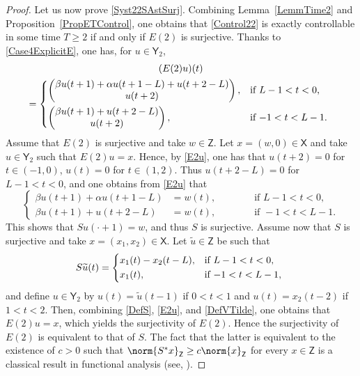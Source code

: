 \begin{proof}
Let us now prove \eqref{Syst22SAstSurj}. Combining Lemma~\ref{LemmTime2} and Proposition~\ref{PropETControl}, one obtains that \eqref{Control22} is exactly controllable in some time $T \geq 2$ if and only if $E(2)$ is surjective. Thanks to \eqref{Case4ExplicitE}, one has, for $u \in \mathsf Y_2$,\vspace*{-3pt}
\begin{multline}
\label{E2u}
(E(2) u)(t)\\ =
\begin{dcases*}
\begin{pmatrix}
\beta u(t + 1) + \alpha u(t + 1 - L) + u(t + 2 - L) \\
u(t + 2) \\
\end{pmatrix}, & if $L - 1 < t < 0$, \\
\begin{pmatrix}
\beta u(t + 1) + u(t + 2 - L) \\
u(t + 2) \\
\end{pmatrix}, & if $-1 < t < L - 1$.
\end{dcases*}
\end{multline}
Assume that $E(2)$ is surjective and take $w \in \mathsf Z$. Let $x = (w, 0) \in \mathsf X$ and take $u \in \mathsf Y_2$ such that $E(2) u = x$. Hence, by \eqref{E2u}, one has that $u(t + 2) = 0$ for $t \in (-1, 0)$, \ie $u(t) = 0$ for $t \in (1, 2)$. Thus $u(t + 2 - L) = 0$ for $L - 1 < t < 0$, and one obtains from \eqref{E2u} that
\[
\left\{
\begin{aligned}
\beta u(t + 1) + \alpha u(t + 1 - L) & = w(t), & \qquad & \text{ if } L - 1 < t < 0, \\
\beta u(t + 1) + u(t + 2 - L) & = w(t), & & \text{ if } -1 < t < L - 1.
\end{aligned}
\right.
\]
This shows that $S u(\cdot + 1) = w$, and thus $S$ is surjective. Assume now that $S$ is surjective and take $x = (x_1, x_2) \in \mathsf X$. Let $\widetilde u \in \mathsf Z$ be such that
\begin{equation}
\label{DefVTilde}
S \widetilde u(t) =
\begin{dcases*}
x_1(t) - x_2(t - L), & if $L - 1 < t < 0$, \\
x_1(t), & if $-1 < t < L - 1$,
\end{dcases*}
\end{equation}
and define $u \in \mathsf Y_2$ by $u(t) = \widetilde u(t - 1)$ if $0 < t < 1$ and $u(t) = x_2(t - 2)$ if $1 < t < 2$. Then, combining \eqref{DefS}, \eqref{E2u}, and \eqref{DefVTilde}, one obtains that $E(2) u = x$, which yields the surjectivity of $E(2)$. Hence the surjectivity of $E(2)$ is equivalent to that of $S$. The fact that the latter is equivalent to the existence of $c > 0$ such that $\norm{S^\ast x}_{\mathsf Z} \geq c \norm{x}_{\mathsf Z}$ for every $x \in \mathsf Z$ is a classical result in functional analysis (see, \eg \cite[Th.\,4.13]{Rudin1991Functional}).
\end{proof}

